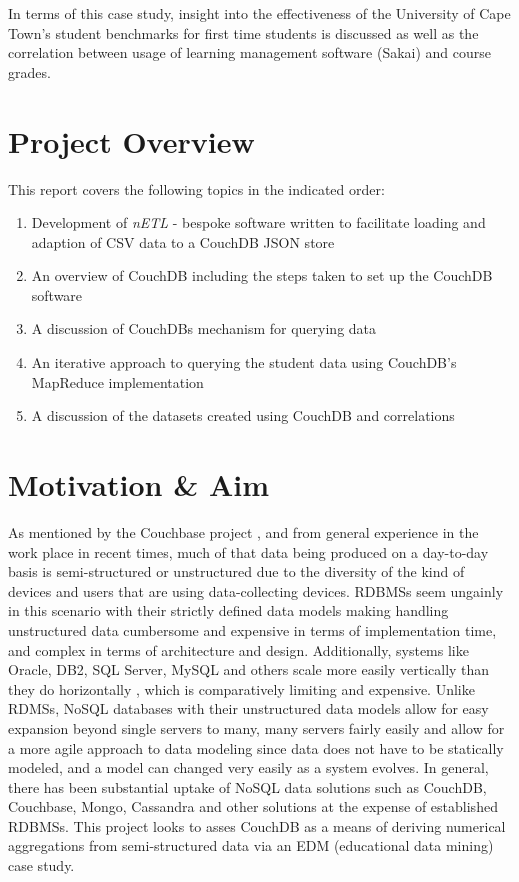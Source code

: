 In terms of this case study, insight into the effectiveness of the University of Cape Town's student benchmarks for first time students is discussed as well as the correlation between usage of learning management software (Sakai) and course grades.

\section{Project Overview}
This report covers the following topics in the indicated order:

\begin{enumerate}
    \item Development of \textit{nETL} - bespoke software written to facilitate loading and adaption of CSV data to a CouchDB JSON store
    \item An overview of CouchDB including the steps taken to set up the CouchDB software
    \item A discussion of CouchDBs mechanism for querying data
    \item An iterative approach to querying the student data using CouchDB's MapReduce implementation
    \item A discussion of the datasets created using CouchDB and correlations
\end{enumerate}

\section{Motivation \& Aim}
As mentioned by the  Couchbase project \cite{couchbaseWhitePaper}, and from general experience in the work place in recent times, much of that data being produced on a day-to-day basis is semi-structured or unstructured due to the diversity of the kind of devices and users that are using data-collecting devices. RDBMSs seem ungainly in this scenario with their strictly defined data models making handling unstructured data cumbersome and expensive in terms of implementation time, and complex in terms of architecture and design. Additionally, systems like Oracle, DB2, SQL Server, MySQL and others scale more easily vertically than they do horizontally \cite{couchbaseWhitePaper}, which is comparatively limiting and expensive. Unlike RDMSs, NoSQL databases with their unstructured data models allow for easy expansion beyond single servers to many, many servers fairly easily and allow for a more agile approach to data modeling since data does not have to be statically modeled, and a model can changed very easily as a system evolves. In general, there has been substantial uptake of NoSQL data solutions such as CouchDB, Couchbase, Mongo, Cassandra and other solutions at the expense of established RDBMSs. This project looks to asses CouchDB as a means of deriving numerical aggregations from semi-structured data via an EDM (educational data mining) case study.

